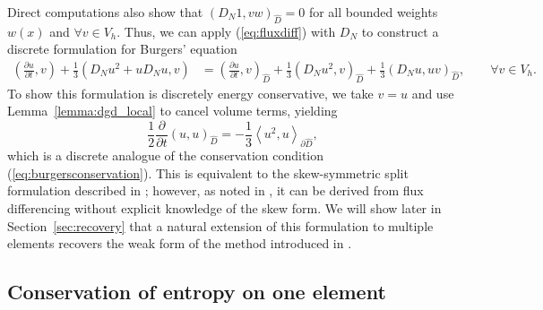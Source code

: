 \documentclass[preprint,10pt]{article}
\theoremstyle{definition}
\theoremstyle{lemma}
\theoremstyle{theorem}
\theoremstyle{assumption}
\newcommand{\pd}[2]{\frac{\partial#1}{\partial#2}}
\newcommand{\LRp}[1]{\left( #1 \right)}
\newcommand{\LRa}[1]{\left\langle #1 \right\rangle}
\begin{document}
Direct computations also show that $\LRp{D_N 1,vw}_{\widehat{D}} = 0$ for all bounded weights $w(x)$ and $\forall v \in V_h$.  Thus, we can apply (\ref{eq:fluxdiff}) with $D_N$ to construct a discrete formulation for Burgers' equation
\begin{align}
\LRp{\pd{u}{t},v} + \frac{1}{3}\LRp{D_N u^2 + uD_Nu,v} &= \LRp{\pd{u}{t},v}_{\widehat{D}} + \frac{1}{3}\LRp{D_N u^2,v}_{\widehat{D}} + \frac{1}{3}\LRp{D_Nu,uv}_{\widehat{D}},
\qquad \forall v\in V_h.
\label{eq:burgersdiscrete}
\end{align}
To show this formulation is discretely energy conservative, we take $v=u$ and use Lemma~\ref{lemma:dgd_local} to cancel volume terms, yielding
\[
\frac{1}{2}\pd{}{t}\LRp{u,u}_{\widehat{D}} = -\frac{1}{3}\LRa{u^2,u}_{\partial \widehat{D}},
\]
which is a discrete analogue of the conservation condition (\ref{eq:burgersconservation}).  This is equivalent to the skew-symmetric split formulation described in \cite{gassner2013skew}; however, as noted in \cite{chen2017entropy}, it can be derived from flux differencing without explicit knowledge of the skew form.  We will show later in Section~\ref{sec:recovery} that a natural extension of this formulation to multiple elements recovers the weak form of the method introduced in \cite{ranocha2017extended}.  



\subsection{Conservation of entropy on one element}
\end{document}
